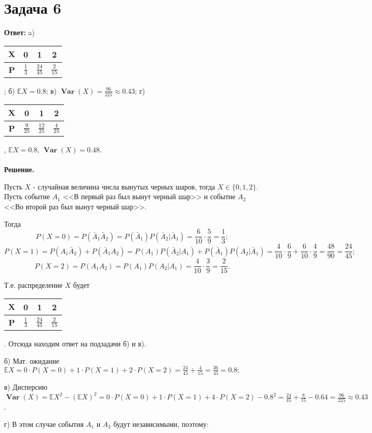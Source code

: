 \documentclass{article}
\DeclareMathOperator{\Var}{\textbf{Var}}
\begin{document}
\section*{Задача 6}
{\bf Ответ: } a) \begin{tabular}{|c|c|c|c|}
     \hline
     $\textbf{X}$ & 0 & 1 & 2\\
     \hline
     \textbf{P} & $\frac{1}{3}$ & $\frac{24}{45}$ & $\frac{2}{15}$\\
     \hline
\end{tabular}; б) $\mathbb{E}X=0.8$; в) $\Var(X)=\frac{96}{225}\approx 0.43$; г) \begin{tabular}{|c|c|c|c|}
     \hline
     $\textbf{X}$ & 0 & 1 & 2\\
     \hline
     \textbf{P} & $\frac{9}{25}$ & $\frac{12}{25}$ & $\frac{4}{25}$\\
     \hline
\end{tabular}, $\mathbb{E}X=0.8$, $\Var(X)=0.48$.
\\
\\
{\bf Решение.}
\par
Пусть $X$ - случайная величина числа вынутых черных шаров, тогда $X \in \{0,1,2\}$. Пусть событие $A_1$  <<В первый раз был вынут черный шар>> и событие $A_2$ <<Во второй раз был вынут черный шар>>. 
\par
Тогда
$$P(X=0)=P(\bar A_1 \bar A_2)=P(\bar A_1)P(\bar A_2|\bar A_1)=\frac{6}{10}\cdot\frac{5}{9}=\frac{1}{3};$$
$$P(X=1)=P(A_1 \bar A_2) + P(\bar A_1 A_2)=P(A_1)P(\bar A_2|A_1) + P(\bar A_1)P(A_2|\bar A_1)=\frac{4}{10}\cdot\frac{6}{9}+\frac{6}{10}\cdot\frac{4}{9}=\frac{48}{90}=\frac{24}{45};$$
$$P(X=2)=P(A_1A_2)=P(A_1)P(A_2|A_1)=\frac{4}{10}\cdot\frac{3}{9}=\frac{2}{15}.$$
\par
Т.е. распределение $X$ будет \begin{tabular}{|c|c|c|c|}\hline$\textbf{X}$ & 0 & 1 & 2\\\hline\textbf{P} & $\frac{1}{3}$ & $\frac{24}{45}$ & $\frac{2}{15}$\\\hline\end{tabular}. Отсюда находим ответ на подзадачи б) и в). 
\par
б) Мат. ожидание $\mathbb{E}X=0\cdot P(X=0)+1\cdot P(X=1)+2\cdot P(X=2)=\frac{24}{45}+\frac{4}{15}=\frac{36}{45}=0.8;$
\par
в) Дисперсию $\Var(X) =\mathbb{E}X^2-(\mathbb{E}X)^2 = 0\cdot P(X=0) + 1\cdot P(X=1)+4\cdot P(X=2) - 0.8^2 = \frac{24}{45}+\frac{8}{15}-0.64=\frac{96}{225}\approx 0.43$.
\par
г) В этом случае события $A_1$ и $A_2$ будут независимыми, поэтому:
\end{document}
